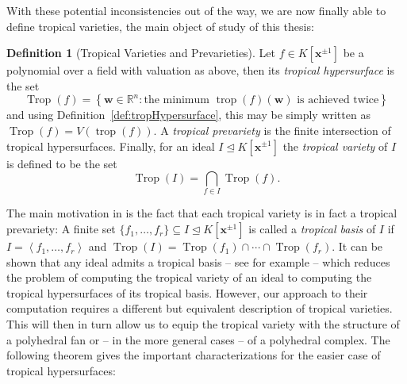 \documentclass[
  paper=a4,
  titlepage,
  bibliography=totoc,
  pagesize=pdftex
]{scrartcl}
\numberwithin{figure}{section}
\numberwithin{equation}{section}
\numberwithin{table}{section}
\newcommand*\setR{\mathds{R}}
\newcommand*\ideal[1]{\left\langle #1 \right\rangle}
\let\vec\mathbf
\let\idealof\trianglelefteq
\DeclareMathOperator{\Trop}{Trop}
\DeclareMathOperator{\trop}{trop}
\theoremstyle{definition}
\newtheorem{definition}{Definition}
\numberwithin{definition}{section}
\begin{document}
With these potential inconsistencies out of the way, we are now finally able to define
tropical varieties, the main object of study of this thesis:

\begin{definition}[Tropical Varieties and Prevarieties]
  \label{def:tropicalVariety}
  Let $f \in K[\vec x^{\pm1}]$ be a polynomial over a field with valuation as above, then
  its \emph{tropical hypersurface} is the set
  \[
    \Trop(f) = \left\{
      \vec w \in \setR^n :
      \text{the minimum $\trop(f)(\vec w)$ is achieved twice}
    \right\}
  \]
  and using Definition~\ref{def:tropHypersurface}, this may be simply written as $\Trop(f)
  = V(\trop(f))$. A \emph{tropical prevariety} is the finite intersection of tropical
  hypersurfaces. Finally, for an ideal $I \idealof K[\vec x^{\pm1}]$ the \emph{tropical
  variety} of $I$ is defined to be the set
  \[
    \Trop(I) = \bigcap_{f \in I} \Trop(f).
  \]
\end{definition}

The main motivation in \cite{compTropVar} is the fact that each tropical variety is in
fact a tropical prevariety: A finite set $\{ f_1, \dots, f_r \} \subseteq I \idealof
K[\vec x^{\pm1}]$ is called a \emph{tropical basis} of $I$ if $I = \ideal{f_1, \dots,
f_r}$ and $\Trop(I) = \Trop(f_1) \cap \cdots \cap \Trop(f_r)$. It can be shown that any
ideal admits a tropical basis -- see for example \cite[Theorem~2.9]{compTropVar} -- which
reduces the problem of computing the tropical variety of an ideal to computing the
tropical hypersurfaces of its tropical basis. However, our approach to their computation
requires a different but equivalent description of tropical varieties. This will then in
turn allow us to equip the tropical variety with the structure of a polyhedral fan or --
in the more general cases -- of a polyhedral complex. The following theorem gives the
important characterizations for the easier case of tropical hypersurfaces:
\end{document}
